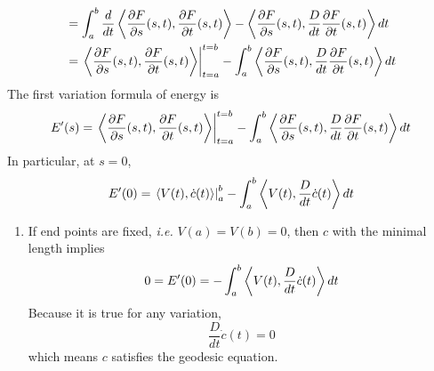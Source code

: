 \begin{enumerate}[label=\arabic{*}.]
\begin{equation*}
\begin{aligned}
			&= \int_a^b \frac{d}{dt}\left\langle \frac{\partial F}{\partial s}(s,t),\frac{\partial F}{\partial t}(s,t) \right\rangle - \left\langle \frac{\partial F}{\partial s}(s,t),\frac{D}{dt}\frac{\partial F}{\partial t}(s,t) \right\rangle dt \\
			&= \left.\left\langle \frac{\partial F}{\partial s}(s,t),\frac{\partial F}{\partial t}(s,t) \right\rangle\right\lvert_{t=a}^{t=b} - \int_a^b\left\langle \frac{\partial F}{\partial s}(s,t),\frac{D}{dt}\frac{\partial F}{\partial t}(s,t) \right\rangle dt
		\end{aligned}
	\end{equation*}
	The first variation formula of energy is
	\begin{equation}\label{eq:firstvariation}
		E^\prime(s)= \left.\left\langle \frac{\partial F}{\partial s}(s,t),\frac{\partial F}{\partial t}(s,t) \right\rangle\right\lvert_{t=a}^{t=b} - \int_a^b\left\langle \frac{\partial F}{\partial s}(s,t),\frac{D}{dt}\frac{\partial F}{\partial t}(s,t) \right\rangle dt
	\end{equation}
	In particular, at $s = 0$,
	\begin{equation*}
		E^\prime(0) = \left.\left\langle V(t),\dot{c}(t) \right\rangle\right\lvert_{a}^{b} - \int_a^b\left\langle V(t),\frac{D}{dt}\dot{c}(t) \right\rangle dt
	\end{equation*}
	\begin{rmk}
		\begin{enumerate}[label=(\arabic{*})]
			\item If end points are fixed, \emph{i.e.} $V(a) = V(b) = 0$, then $c$ with the minimal length implies
			\begin{equation*}
				0 = E^\prime(0) = - \int_a^b\left\langle V(t),\frac{D}{dt}\dot{c}(t) \right\rangle dt
			\end{equation*}
			Because it is true for any variation, 
			\begin{equation*}
				\frac{D}{dt}\dot{c}(t) = 0
			\end{equation*}
			which means $c$ satisfies the geodesic equation.


\end{enumerate}
\end{rmk}
\end{enumerate}
